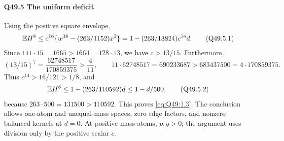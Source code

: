 \paragraph{Q49.5 The uniform deficit}
Using the positive square envelope,
\[
\mathbb E H^8
\le c^{16}\{w^{16}-(263/1152)x^2\}
=1-(263/13824)c^{14}d.
\tag{Q49.5.1}\label{eq:Q49:5.1}
\]
Since \(111\cdot15=\allowbreak 1665>\allowbreak 1664=\allowbreak 128\cdot13\), we have \(c>\allowbreak 13/15\).
Furthermore,
\[
(13/15)^7=\frac{62748517}{170859375}>\frac4{11},
\qquad
11\cdot62748517=690233687>683437500=4\cdot170859375.
\]
Thus \(c^{14}>\allowbreak 16/121>\allowbreak 1/8\), and
\[
\mathbb E H^8\le1-(263/110592)d\le1-d/500,
\tag{Q49.5.2}\label{eq:Q49:5.2}
\]
because \(263\cdot500=\allowbreak 131500>\allowbreak 110592\).
This proves \eqref{eq:Q49:1.3}.
The conclusion allows one-atom and unequal-mass spaces, zero edge factors, and nonzero balanced kernels at \(d=\allowbreak 0\).
At positive-mass atoms, \(p,\allowbreak q>\allowbreak 0\); the argument uses division only by the positive scalar \(c\).
